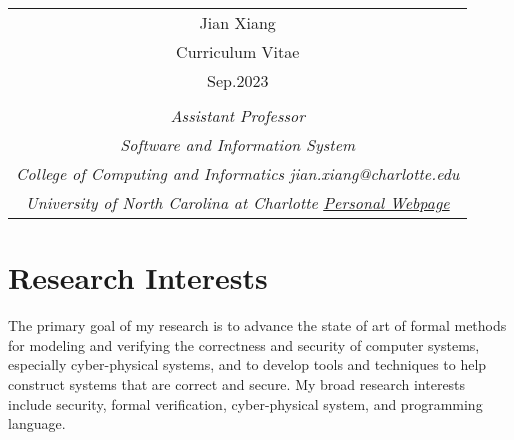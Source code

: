 \documentclass[11pt]{article}
\begin{document}
\renewcommand{\baselinestretch}{1.2} 

\pagestyle{empty} 


\begin{tabularx}{\linewidth}{@{} C @{}}
\Huge{\textsf{Jian Xiang}} \\[7.5pt]
Curriculum Vitae  \\
Sep.2023\\
\\
\noindent \textit{Assistant Professor} \hfill { } \\
\noindent \textit{Software and Information System} \hfill { } \\
\noindent \textit{College of Computing and Informatics} \hfill \textit{jian.xiang@charlotte.edu} \\
\noindent \textit{University of North Carolina at Charlotte}     \hfill  \href{https://www.jianxiang.info}{\textit{Personal Webpage}} \\
\end{tabularx}

\vspace{4mm}


\section{Research Interests}

The primary goal of my research is to advance the state of art of formal methods for modeling and verifying the correctness and security of computer systems, especially cyber-physical systems, and to develop tools and techniques to help construct systems that are correct and secure.
%
My broad research interests include security, formal verification, cyber-physical system, and programming language.

%
%
\end{document}
